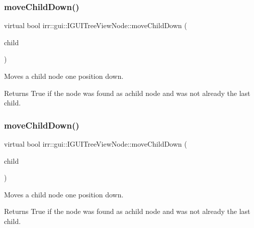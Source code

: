 \subsubsection{\texorpdfstring{move\+Child\+Down()}{moveChildDown()}\hspace{0.1cm}{\footnotesize\ttfamily [1/2]}}
{\footnotesize\ttfamily virtual bool irr\+::gui\+::\+I\+G\+U\+I\+Tree\+View\+Node\+::move\+Child\+Down (\begin{DoxyParamCaption}\item[{\hyperlink{classirr_1_1gui_1_1IGUITreeViewNode}{I\+G\+U\+I\+Tree\+View\+Node} $\ast$}]{child }\end{DoxyParamCaption})\hspace{0.3cm}{\ttfamily [pure virtual]}}



Moves a child node one position down. 

\begin{DoxyReturn}{Returns}
True if the node was found as achild node and was not already the last child. 
\end{DoxyReturn}
\mbox{\label{classirr_1_1gui_1_1IGUITreeViewNode_a3c7eb8a1b15c2018f32d13c3ce2ee219}} 
\subsubsection{\texorpdfstring{move\+Child\+Down()}{moveChildDown()}\hspace{0.1cm}{\footnotesize\ttfamily [2/2]}}
{\footnotesize\ttfamily virtual bool irr\+::gui\+::\+I\+G\+U\+I\+Tree\+View\+Node\+::move\+Child\+Down (\begin{DoxyParamCaption}\item[{\hyperlink{classirr_1_1gui_1_1IGUITreeViewNode}{I\+G\+U\+I\+Tree\+View\+Node} $\ast$}]{child }\end{DoxyParamCaption})\hspace{0.3cm}{\ttfamily [pure virtual]}}



Moves a child node one position down. 

\begin{DoxyReturn}{Returns}
True if the node was found as achild node and was not already the last child. 
\end{DoxyReturn}
\mbox{\label{classirr_1_1gui_1_1IGUITreeViewNode_a9e55b868695250c09e53e5fa961a812c}} 
